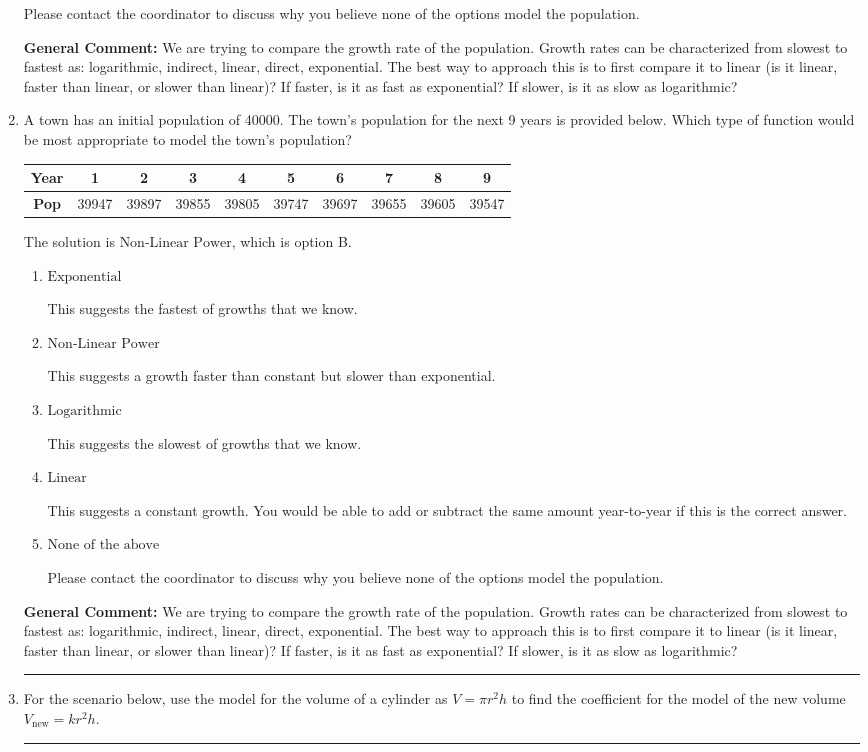 \documentclass{extbook}[14pt]
\newcommand{\litem}[1]{\item #1

\rule{\textwidth}{0.4pt}}
\begin{document}
\begin{enumerate}
{\begin{enumerate}[label=\Alph*.]
Please contact the coordinator to discuss why you believe none of the options model the population.
\end{enumerate}

\textbf{General Comment:} We are trying to compare the growth rate of the population. Growth rates can be characterized from slowest to fastest as: logarithmic, indirect, linear, direct, exponential. The best way to approach this is to first compare it to linear (is it linear, faster than linear, or slower than linear)? If faster, is it as fast as exponential? If slower, is it as slow as logarithmic?
}
\litem{
A town has an initial population of 40000. The town's population for the next 9 years is provided below. Which type of function would be most appropriate to model the town's population?


\begin{tabular}{c|c|c|c|c|c|c|c|c|c}
\textbf{Year} &1 &2 &3 &4 &5 &6 &7 &8 &9\tabularnewline \hline
\textbf{Pop} &39947 &39897 &39855 &39805 &39747 &39697 &39655 &39605 &39547\end{tabular}The solution is \( \text{Non-Linear Power} \), which is option B.\begin{enumerate}[label=\Alph*.]
\item \( \text{Exponential} \)

This suggests the fastest of growths that we know.
\item \( \text{Non-Linear Power} \)

This suggests a growth faster than constant but slower than exponential.
\item \( \text{Logarithmic} \)

This suggests the slowest of growths that we know.
\item \( \text{Linear} \)

This suggests a constant growth. You would be able to add or subtract the same amount year-to-year if this is the correct answer.
\item \( \text{None of the above} \)

Please contact the coordinator to discuss why you believe none of the options model the population.
\end{enumerate}

\textbf{General Comment:} We are trying to compare the growth rate of the population. Growth rates can be characterized from slowest to fastest as: logarithmic, indirect, linear, direct, exponential. The best way to approach this is to first compare it to linear (is it linear, faster than linear, or slower than linear)? If faster, is it as fast as exponential? If slower, is it as slow as logarithmic?
}
\litem{
For the scenario below, use the model for the volume of a cylinder as $V = \pi r^2 h$ to find the coefficient for the model of the new volume $V_{\text{new}} = k r^2 h$.

}
\end{enumerate}
\end{document}

